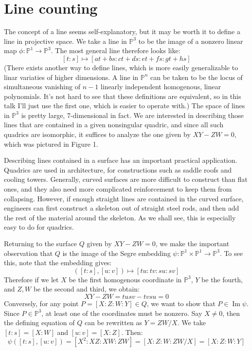 \documentclass[12 pt]{article}
\newcommand{\Proj}{\mathbb{P}}
\DeclareMathOperator{\imag}{Im}
\begin{document}
\section{Line counting}
The concept of a line seems self-explanatory, but it may be worth it to define a line in projective space. We take a line in $\Proj^3$ to be the image
of a nonzero linear map $\phi: \Proj^1 \to \Proj^3$. The most general line therefore looks like:
\[      [t:s] \mapsto [at + bs : ct+ds : et+fs : gt+hs]    \]
(There exists another way to define lines, which is more easily generalizable to linar variaties of higher dimensions. A line in $\Proj^n$ can 
be taken to be the locus of simultaneous vanishing of $n-1$ linearly independent homogenous, linear polynomials. It's not hard to see that 
these definitions are equivalent, so in this talk I'll just use the first one, which is easier to operate with.) The space of lines in $\Proj^3$ 
is pretty large, 7-dimensional in fact. We are interested in describing those lines that are contained in a given nonsingular quadric, and 
since all such quadrics are isomorphic, it suffices to analyze the one given by $XY - ZW = 0$, which was pictured in Figure 1.

Describing lines contained in a surface has an important practical application. Quadrics are used in architecture, for constructions such as 
saddle roofs and cooling towers. Generally, curved surfaces are more difficult to construct than flat ones, and they also need more complicated 
reinforcement to keep them from collapsing. However, if enough straight lines are contained in the curved surface, engineers can first
construct a skeleton out of straight steel rods, and then add the rest of the material around the skeleton. As we shall see, this is especially
easy to do for quadrics.

Returning to the surface $Q$ given by $XY-ZW = 0$, we make the important observation that $Q$ is the image of the Segre embedding 
$\psi: \Proj^1 \times \Proj^1 \to \Proj^3$. To see this, note that the embedding gives:
\[   ([t:s] , [u:v] )  \mapsto [tu : tv : su : sv]   \]
Therefore if we let $X$ be the first homogenous coordinate in $\Proj^3$, $Y$ be the fourth, and $Z,W$ be the second and third, we obtain:
\[     XY - ZW = tusv - tvsu = 0   \]
Conversely, for any point $P= [X:Z:W:Y] \in Q$, we want to show that $P \in \imag \psi$. Since $P \in \Proj^3$, at least one of the 
coordinates must be nonzero. Say $X \neq 0$, then the defining equation of $Q$ can be rewritten as $Y = ZW/X$. We take $[t:s] = [X : W]$ 
and $[u:v] = [X : Z]$. Then:
\[ \psi ([t:s] , [u:v] ) = [X^2 : XZ : XW : ZW] = [X : Z : W : ZW/X] = [X:Z:W:Y] \]
\end{document}
